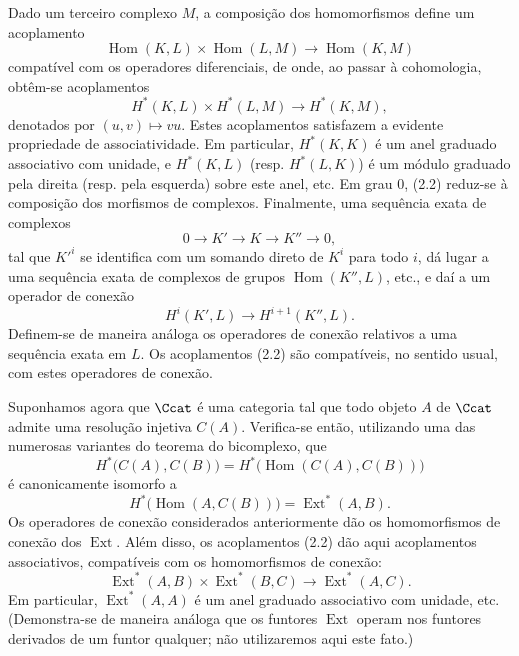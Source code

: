 Dado um terceiro complexo $M$, a composição dos homomorfismos
define um acoplamento
\[
  \operatorname{Hom}(K,L)\times\operatorname{Hom}(L,M)
  \longrightarrow\operatorname{Hom}(K,M)
\]
compatível com os operadores diferenciais, de onde, ao passar à cohomologia,
obtêm-se acoplamentos
\begin{equation}\tag{2.2}
  H^{*}(K,L)\times H^{*}(L,M)\longrightarrow H^{*}(K,M),
\end{equation}
denotados por $(u,v)\longmapsto vu$. Estes acoplamentos satisfazem a evidente propriedade
de associatividade. Em particular, $H^{*}(K,K)$ é um anel graduado associativo
com unidade, e $H^{*}(K,L)$ (resp. $H^{*}(L,K)$) é um módulo graduado pela direita
(resp. pela esquerda) sobre este anel, etc. Em grau $0$, (2.2) reduz-se à
composição dos morfismos de complexos. Finalmente, uma sequência exata de
complexos
\[
  0\longrightarrow K'\longrightarrow K\longrightarrow K''\longrightarrow 0,
\]
tal que $K'^{i}$ se identifica com um somando direto de $K^{i}$ para todo $i$,
dá lugar a uma sequência exata de complexos de grupos
$\operatorname{Hom}(K'',L)$, etc., e daí a um operador de conexão
\[
  H^{i}(K',L)\longrightarrow H^{i+1}(K'',L).
\]
Definem-se de maneira análoga os operadores de conexão relativos a uma sequência exata em $L$. Os
acoplamentos (2.2) são compatíveis, no sentido usual, com estes operadores de conexão.

Suponhamos agora que $\Ccat$ é uma categoria tal que todo objeto $A$
de $\Ccat$ admite uma resolução injetiva $C(A)$. Verifica-se então, utilizando
uma das numerosas variantes do teorema do bicomplexo, que
\[
  H^{*}\bigl(C(A),C(B)\bigr)
  =H^{*}\bigl(\operatorname{Hom}(C(A),C(B))\bigr)
\]
é canonicamente isomorfo a
\[
  H^{*}\bigl(\operatorname{Hom}(A,C(B))\bigr)
  =\operatorname{Ext}^{*}(A,B).
\]
Os operadores de conexão considerados anteriormente dão os homomorfismos de conexão dos
$\operatorname{Ext}$. Além disso, os acoplamentos (2.2) dão aqui
acoplamentos associativos, compatíveis com os homomorfismos de conexão:
\begin{equation}\tag{2.3}
  \operatorname{Ext}^{*}(A,B)\times\operatorname{Ext}^{*}(B,C)
  \longrightarrow\operatorname{Ext}^{*}(A,C).
\end{equation}
Em particular, $\operatorname{Ext}^{*}(A,A)$ é um anel graduado associativo
com unidade, etc. (Demonstra-se de maneira análoga que os funtores
$\operatorname{Ext}$ operam nos funtores derivados de um funtor
qualquer; não utilizaremos aqui este fato.)

